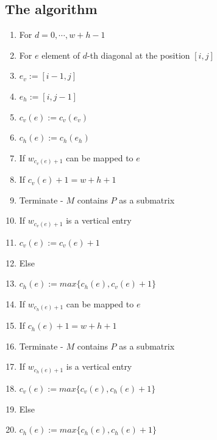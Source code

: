 \subsection{The algorithm}
\begin{enumerate}
\item For $d=0,\cdots,w+h-1$
\item \hspace{5mm} For $e$ element of $d$-th diagonal at the position $[i,j]$
\item \hspace{1cm} $e_v:=[i-1,j]$
\item \hspace{1cm} $e_h:=[i,j-1]$
\item \hspace{1cm} $c_v(e):=c_v(e_v)$
\item \hspace{1cm} $c_h(e):=c_h(e_h)$
\item \hspace{1cm} If $w_{c_v(e)+1}$ can be mapped to $e$
\item \hspace{15mm} If $c_v(e)+1=w+h+1$
\item \hspace{2cm} Terminate - $M$ contains $P$ as a submatrix
\item \hspace{15mm} If $w_{c_v(e)+1}$ is a vertical entry
\item \hspace{2cm} $c_v(e):=c_v(e)+1$
\item \hspace{15mm} Else
\item \hspace{2cm} $c_h(e):=max\{c_h(e),c_v(e)+1\}$
\item \hspace{1cm} If $w_{c_h(e)+1}$ can be mapped to $e$
\item \hspace{15mm} If $c_h(e)+1=w+h+1$
\item \hspace{2cm} Terminate - $M$ contains $P$ as a submatrix
\item \hspace{15mm} If $w_{c_h(e)+1}$ is a vertical entry
\item \hspace{2cm} $c_v(e):=max\{c_v(e),c_h(e)+1\}$
\item \hspace{15mm} Else
\item \hspace{2cm} $c_h(e):=max\{c_h(e),c_h(e)+1\}$
\end{enumerate}

